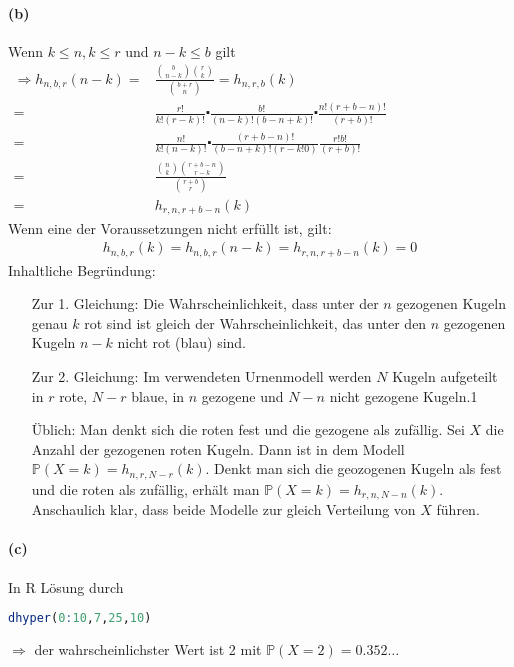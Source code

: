 \documentclass[10pt, a4paper]{article}
\begin{document}
\paragraph*{(b)}
Wenn $k\leq n, k\leq r$ und $n-k\leq b$ gilt	\\
\begin{align*}
	\Rightarrow h_{n,b,r}(n-k)=&\frac{\binom{b}{n-k}\binom{r}{k}}{\binom{b+r}{n}}=h_{n,r,b}(k)	\hspace{200pt}\\
	=&\frac{r!}{k!(r-k)!}\centerdot\frac{b!}{(n-k)!(b-n+k)!}\centerdot\frac{n!(r+b-n)!}{(r+b)!}	\\
	=&\frac{n!}{k!(n-k)!}\centerdot\frac{(r+b-n)!}{(b-n+k)!(r-k!0)}\frac{r!b!}{(r+b)!}	\\
	=&\frac{\binom{n}{k}\binom{r+b-n}{r-k}}{\binom{r+b}{r}}	\\
	=&h_{r,n,r+b-n}(k)
\end{align*}
Wenn eine der Voraussetzungen nicht erfüllt ist, gilt:
\begin{align*}
	h_{n,b,r}(k)=h_{n,b,r}(n-k)=h_{r,n,r+b-n}(k)=0
\end{align*}
Inhaltliche Begründung:
\begin{itemize}
	\item[Zur 1. Gleichung:] Die Wahrscheinlichkeit, dass unter der $n$ gezogenen Kugeln genau $k$ rot sind ist gleich der Wahrscheinlichkeit, das unter den $n$ gezogenen Kugeln $n-k$ nicht rot (blau) sind.
	\item[Zur 2. Gleichung:] Im verwendeten Urnenmodell werden $N$ Kugeln aufgeteilt in $r$ rote, $N-r$ blaue, in $n$ gezogene und $N-n$ nicht gezogene Kugeln.1
	\item[Üblich:] Man denkt sich die roten fest und die gezogene als zufällig. Sei $X$ die Anzahl der gezogenen roten Kugeln. Dann ist in dem Modell $\mathbb{P}(X=k)=h_{n,r,N-r}(k)$. Denkt man sich die geozogenen Kugeln als fest und die roten als zufällig, erhält man $\mathbb{P}(X=k)=h_{r,n,N-n}(k)$.	\\
	Anschaulich klar, dass beide Modelle zur gleich Verteilung von $X$ führen.
\end{itemize}

\paragraph*{(c)}
In R Lösung durch
\begin{lstlisting}[language=R]
	dhyper(0:10,7,25,10)
\end{lstlisting}
$\Rightarrow$ der wahrscheinlichster Wert ist 2 mit $\mathbb{P}(X=2)=0.352\dots$
\end{document}
